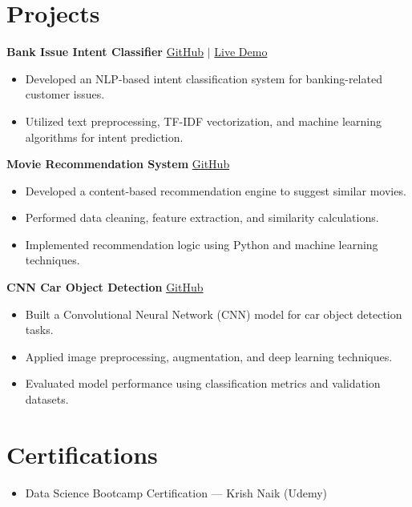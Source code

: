 \documentclass[letterpaper,10pt]{article}
\begin{document}
\section{Projects}
  \vspace{4pt}
  
  \textbf{Bank Issue Intent Classifier} \hfill \href{https://github.com/Rohitk69992/Bank-Issue-Intent-Classifier}{GitHub} $|$ \href{https://bank-issue-intent-classifier.vercel.app}{Live Demo}
  \begin{itemize}[leftmargin=*,noitemsep,topsep=2pt]
      \item Developed an NLP-based intent classification system for banking-related customer issues.
      \item Utilized text preprocessing, TF-IDF vectorization, and machine learning algorithms for intent prediction.
  \end{itemize}
  \vspace{4pt}

  \textbf{Movie Recommendation System} \hfill \href{https://github.com/Rohitk69992}{GitHub}
  \begin{itemize}[leftmargin=*,noitemsep,topsep=2pt]
      \item Developed a content-based recommendation engine to suggest similar movies.
      \item Performed data cleaning, feature extraction, and similarity calculations.
      \item Implemented recommendation logic using Python and machine learning techniques.
  \end{itemize}
  \vspace{4pt}

  \textbf{CNN Car Object Detection} \hfill \href{https://github.com/Rohitk69992/CNN-Car-Object-Detection}{GitHub}
  \begin{itemize}[leftmargin=*,noitemsep,topsep=2pt]
      \item Built a Convolutional Neural Network (CNN) model for car object detection tasks.
      \item Applied image preprocessing, augmentation, and deep learning techniques.
      \item Evaluated model performance using classification metrics and validation datasets.
  \end{itemize}

\section{Certifications}
  \vspace{4pt}
  \begin{itemize}[leftmargin=*,noitemsep,topsep=2pt]
      \item Data Science Bootcamp Certification — Krish Naik (Udemy)
  \end{itemize}
\end{document}
